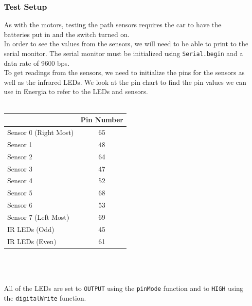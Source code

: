 \documentclass[12pt]{article}
\begin{document}
\subsubsection{Test Setup}
As with the motors, testing the path sensors requires the car to have the batteries put in and the switch turned on.
\\ 
In order to see the values from the sensors, we will need to be able to print to the serial monitor. The serial monitor must be initialized using \texttt{Serial.begin} and a data rate of 9600 bps.
\\ 
To get readings from the sensors, we need to initialize the pins for the sensors as well as the infrared LEDs. We look at the pin chart to find the pin values we can use in Energia to refer to the LEDs and sensors.
\\ \\ 
\begin{tabu}{|l|c|}
\hline
{} & \textbf{Pin Number} \\ \hline
Sensor 0 (Right Most) & 65 \\
Sensor 1              & 48 \\
Sensor 2              & 64 \\
Sensor 3              & 47 \\
Sensor 4              & 52 \\
Sensor 5              & 68 \\
Sensor 6              & 53 \\
Sensor 7 (Left Most)  & 69 \\
IR LEDs (Odd)         & 45 \\
IR LEDs (Even)        & 61 \\ \hline
\end{tabu}
\\ \\ \\ 
All of the LEDs are set to \texttt{OUTPUT} using the \texttt{pinMode} function and to \texttt{HIGH} using the \texttt{digitalWrite} function.

\end{document}
